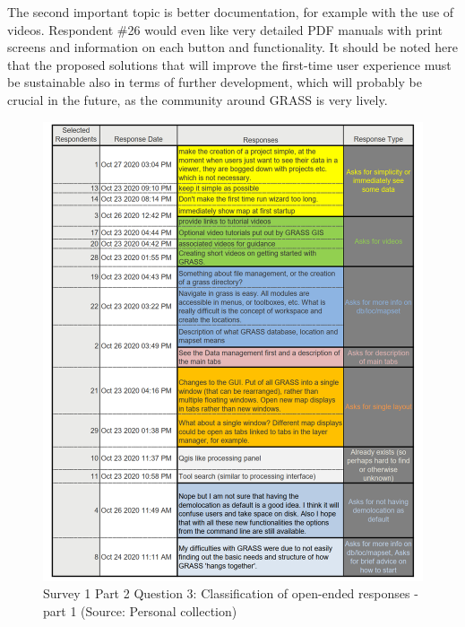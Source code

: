 \documentclass[a4paper,10pt,twoside]{article}
\begin{document}
The second important topic is better documentation, for example with the use of videos. Respondent \#26 would even like very detailed PDF manuals with print screens and information on each button and functionality.  It should be noted here that the proposed solutions that will improve the first-time user experience must be sustainable also in terms of further development, which will probably be crucial in the future, as the community around GRASS is very lively. 
\newpage
\vspace{0.3cm}
\begin{figure}[hbt!] 
\begin{center}
\includegraphics[width=17cm]{../surveys/analyzed_data/survey1_part2_question3_open_ended-2_2.png} 
\caption[Survey 1 Part 2 Question 3: Classification of open-ended responses - part 1]{Survey 1 Part 2 Question 3: Classification of open-ended responses - part 1 (Source: Personal collection)}
\label{fig:survey1_part2_question3_open_ended-1_1}
\end{center}
\end{figure}
\end{document}
